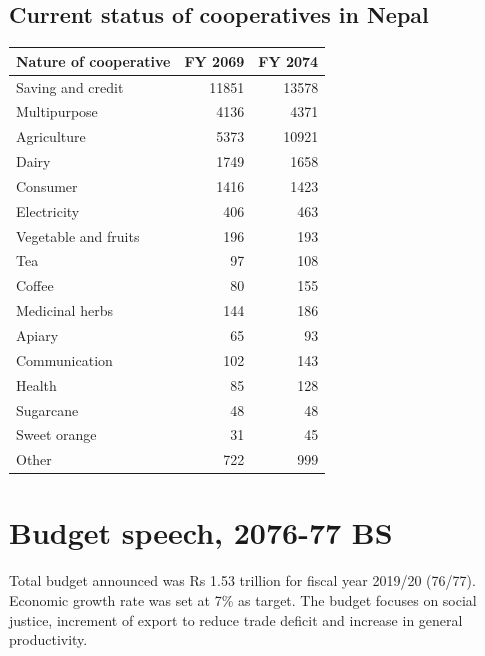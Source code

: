 \documentclass[
  openany]{book}
\begin{document}
\hypertarget{current-status-of-cooperatives-in-nepal}{%
\subsection{Current status of cooperatives in Nepal}\label{current-status-of-cooperatives-in-nepal}}

\begin{table}[H]
\centering\begingroup\fontsize{8}{10}\selectfont

\begin{tabular}{lrr}
\toprule
Nature of cooperative & FY 2069 & FY 2074\\
\midrule
\rowcolor{gray!6}  Saving and credit & 11851 & 13578\\
Multipurpose & 4136 & 4371\\
\rowcolor{gray!6}  Agriculture & 5373 & 10921\\
Dairy & 1749 & 1658\\
\rowcolor{gray!6}  Consumer & 1416 & 1423\\
\addlinespace
Electricity & 406 & 463\\
\rowcolor{gray!6}  Vegetable and fruits & 196 & 193\\
Tea & 97 & 108\\
\rowcolor{gray!6}  Coffee & 80 & 155\\
Medicinal herbs & 144 & 186\\
\addlinespace
\rowcolor{gray!6}  Apiary & 65 & 93\\
Communication & 102 & 143\\
\rowcolor{gray!6}  Health & 85 & 128\\
Sugarcane & 48 & 48\\
\rowcolor{gray!6}  Sweet orange & 31 & 45\\
\addlinespace
Other & 722 & 999\\
\bottomrule
\end{tabular}
\endgroup{}
\end{table}

\hypertarget{budget-speech-2076-77-bs}{%
\section{Budget speech, 2076-77 BS}\label{budget-speech-2076-77-bs}}

Total budget announced was Rs 1.53 trillion for fiscal year 2019/20 (76/77). Economic growth rate was set at 7\% as target. The budget focuses on social justice, increment of export to reduce trade deficit and increase in general productivity.
\end{document}

